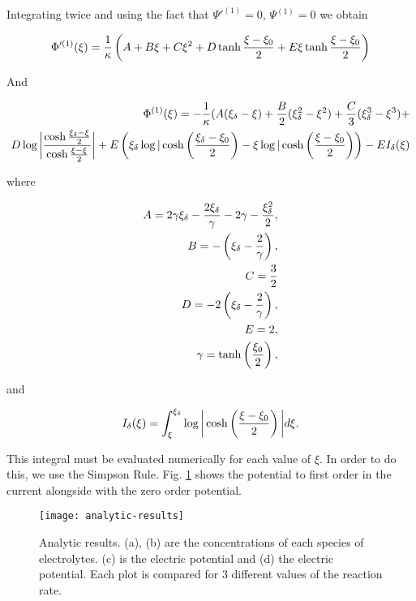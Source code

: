 Integrating twice and using the fact that $\Psi'^{(1)} = 0$, $\Psi^{(1)} = 0$ we obtain

\begin{eqnarray}
\Phi'^{(1)}(\xi) = \frac{1}{\kappa} \left({A + B\xi + C\xi^2 + D \tanh{\frac{\xi-\xi_0}{2}}+E\xi\tanh{\frac{\xi-\xi_0}{2}}}\right) 
\end{eqnarray}


And 

\begin{eqnarray}
\Phi^{(1)}(\xi) = -\frac{1}{\kappa} (A(\xi_\delta - \xi) + \frac{B}{2}(\xi_\delta^2-\xi^2) + \frac{C}{3}(\xi_\delta^3 - \xi^3) + \\
D\log\bigg|\frac{\cosh{\frac{\xi_\delta-\xi}{2}}}{\cosh{\frac{\xi-\xi}{2}}}\bigg| + E \left({\xi_\delta\log|\cosh\left({\frac{\xi_\delta-\xi_0}{2}}\right)-\xi\log|\cosh\left({\frac{\xi-\xi_0}{2}}\right)}\right)-EI_\delta(\xi)
\end{eqnarray}


where

\begin{eqnarray*}
	A = 2\gamma\xi_\delta - \frac{2\xi_\delta}{\gamma} - 2 \gamma - \frac{\xi_\delta^2}{2},\\
	B = -\left({\xi_\delta -\frac{2}{\gamma}}\right),\\
	C = \frac{3}{2}\\
	D = -2 \left({\xi_\delta - \frac{2}{\gamma}}\right),\\
	E = 2,\\
	\gamma = \tanh\left({\frac{\xi_0}{2}}\right),
\end{eqnarray*}

and

\begin{align}
	I_\delta(\xi) = \int_\xi^{\xi_\delta} \log\bigg|\cosh\left({\frac{\xi-\xi_0}{2}}\right)\bigg| d\xi.
\end{align}




This integral must be evaluated numerically for each value of $\xi$. In order to do this, we use the Simpson Rule. Fig. \ref{fig:analytic-results} shows the potential to first order in the current alongside with the zero order potential. 


\begin{figure}[h!]
 \centering
 \texttt{[image: analytic-results]}
 \caption{Analytic results. (a), (b) are the concentrations of each species of electrolytes. (c) is the electric potential and (d) the electric potential. Each plot is compared for 3 different values of the reaction rate.}
 \label{fig:analytic-results}
\end{figure}




